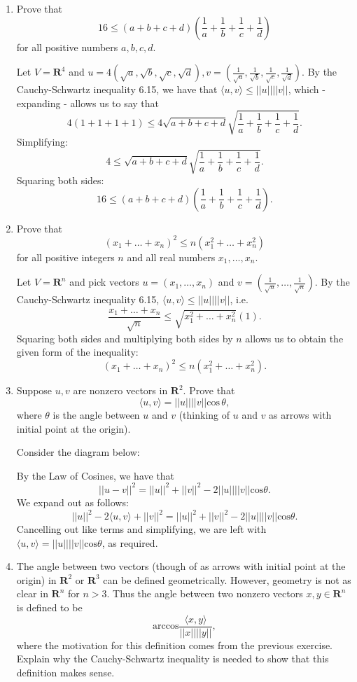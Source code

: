\documentclass{book}
\begin{document}
\begin{enumerate}
\item Prove that \[16 \leq (a+b+c+d)(\frac{1}{a}+\frac{1}{b}+\frac{1}{c}+\frac{1}{d})\] for all positive numbers \(a,b,c,d\).

Let \(V=\textbf{R}^4\) and \(u=4(\sqrt{a},\sqrt{b},\sqrt{c},\sqrt{d}),v=(\frac{1}{\sqrt{a}},\frac{1}{\sqrt{b}},\frac{1}{\sqrt{c}},\frac{1}{\sqrt{d}})\).  By the Cauchy-Schwartz inequality 6.15, we have that \(\langle u,v \rangle \leq ||u||||v||\), which - expanding - allows us to say that \[4(1+1+1+1) \leq 4\sqrt{a+b+c+d}\sqrt{\frac{1}{a}+\frac{1}{b}+\frac{1}{c}+\frac{1}{d}}.\] Simplifying: \[4 \leq \sqrt{a+b+c+d}\sqrt{\frac{1}{a}+\frac{1}{b}+\frac{1}{c}+\frac{1}{d}}.\] Squaring both sides: \[16 \leq (a+b+c+d)(\frac{1}{a}+\frac{1}{b}+\frac{1}{c}+\frac{1}{d}).\]

\item Prove that \[(x_1+\dots+x_n)^2 \leq n(x_1^2+\dots+x_n^2)\] for all positive integers \(n\) and all real numbers \(x_1,\dots,x_n\).

Let \(V=\textbf{R}^n\) and pick vectors \(u=(x_1,\dots,x_n)\) and \(v=(\frac{1}{\sqrt{n}},\dots,\frac{1}{\sqrt{n}})\).  By the Cauchy-Schwartz inequality 6.15, \(\langle u,v \rangle \leq ||u||||v||\), i.e. \[\frac{x_1+\dots+x_n}{\sqrt{n}} \leq \sqrt{x_1^2+\dots+x_n^2}(1).\] Squaring both sides and multiplying both sides by \(n\) allows us to obtain the given form of the inequality: \[(x_1+\dots+x_n)^2 \leq n(x_1^2+\dots+x_n^2).\]

\item Suppose \(u,v\) are nonzero vectors in \(\textbf{R}^2\).  Prove that \[\langle u,v \rangle = ||u||||v|| \textrm{cos} \, \theta,\] where \(\theta\) is the angle between \(u\) and \(v\) (thinking of \(u\) and \(v\) as arrows with initial point at the origin).

Consider the diagram below:

By the Law of Cosines, we have that \[||u-v||^2=||u||^2+||v||^2-2||u||||v||\textrm{cos}\theta.\] We expand out as follows: \[||u||^2-2\langle u,v \rangle + ||v||^2=||u||^2+||v||^2-2||u||||v||\textrm{cos}\theta.\] Cancelling out like terms and simplifying, we are left with \(\langle u,v \rangle = ||u||||v||\textrm{cos}\theta\), as required.

\item The angle between two vectors (though of as arrows with initial point at the origin) in \(\textbf{R}^2\) or \(\textbf{R}^3\) can be defined geometrically.  However, geometry is not as clear in \(\textbf{R}^n\) for \(n > 3\).  Thus the angle between two nonzero vectors \(x,y \in \textbf{R}^n\) is defined to be \[\textrm{arccos} \frac{\langle x,y \rangle}{||x||||y||},\] where the motivation for this definition comes from the previous exercise.  Explain why the Cauchy-Schwartz inequality is needed to show that this definition makes sense.


\end{enumerate}
\end{document}
